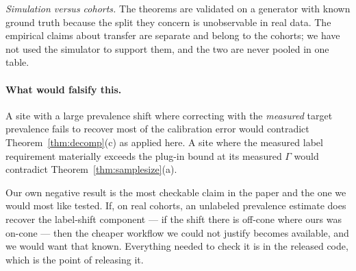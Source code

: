 \emph{Simulation versus cohorts.}  The theorems are validated on a generator
with known ground truth because the split they concern is unobservable in real
data.  The empirical claims about transfer are separate and belong to the
cohorts; we have not used the simulator to support them, and the two are never
pooled in one table.

\paragraph{What would falsify this.}
A site with a large prevalence shift where correcting with the \emph{measured}
target prevalence fails to recover most of the calibration error would
contradict Theorem~\ref{thm:decomp}(c) as applied here.  A site where the
measured label requirement materially exceeds the plug-in bound at its measured
$\Gamma$ would contradict Theorem~\ref{thm:samplesize}(a).

Our own negative result is the most checkable claim in the paper and the one we
would most like tested.  If, on real cohorts, an unlabeled prevalence estimate
does recover the label-shift component --- if the shift there is off-cone where
ours was on-cone --- then the cheaper workflow we could not justify becomes
available, and we would want that known.  Everything needed to check it is in
the released code, which is the point of releasing it.
